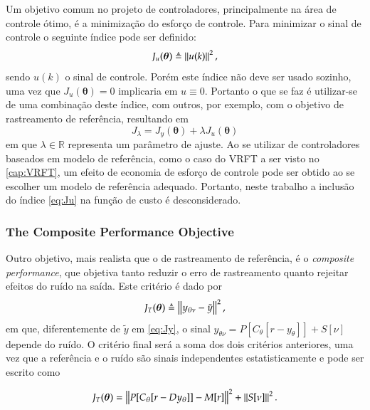 Um objetivo comum no projeto de controladores, principalmente na área de controle ótimo, é a minimização do esforço de controle. Para minimizar o sinal de controle o seguinte índice pode ser definido:
\begin{equation}
   J_u(\bm{\theta}) \triangleq \left\lVert u(k) \right\rVert^{2},
   \label{eq:Ju}
\end{equation}
sendo $u(k)$ o sinal de controle. Porém este índice não deve ser usado sozinho, uma vez que $J_u(\bm{\theta}) = 0$ implicaria em $u \equiv 0$. Portanto o que se faz é utilizar-se de uma combinação deste índice, com outros, por exemplo, com o objetivo de rastreamento de referência, resultando em 
\begin{equation}
   J_\lambda = J_y(\bm{\theta}) + \lambda J_u(\bm{\theta})
   \label{eq:Jl}
\end{equation}
em que $\lambda \in \mathbb{R}$ representa um parâmetro de ajuste.
Ao se utilizar de controladores baseados em modelo de referência, como o caso do VRFT a ser visto no \ref{cap:VRFT}, um efeito de economia de esforço de controle pode ser obtido ao se escolher um modelo de referência adequado. Portanto, neste trabalho a inclusão do índice \eqref{eq:Ju} na função de custo é desconsiderado.



\subsubsection{The Composite Performance Objective}%
\label{sub:the_composite_performance_objective}

Outro objetivo, mais realista que o de rastreamento de referência, é o \textit{composite performance}, que objetiva tanto reduzir o erro de rastreamento quanto rejeitar efeitos do ruído na saída. Este critério é dado por
\begin{equation}
   J_T(\bm{\theta}) \triangleq \left\lVert y_{\theta\nu} - \tilde{y} \right\rVert^2,
   \label{eq:JT}
\end{equation}
em que, diferentemente de $\tilde{y}$ em \eqref{eq:Jy}, o sinal $y_{\theta\nu}= P[C_\theta[r-y_\theta]] + S[\nu]$ depende do ruído. O critério final será a soma dos dois critérios anteriores, uma vez que a referência e o ruído são sinais independentes estatisticamente e pode ser escrito como

\begin{equation}
   J_T(\bm{\theta}) = \left\lVert P[C_\theta[r-Dy_\theta]] - M[r] \right\rVert^{2} + \left\lVert S[\nu] \right\rVert^2.
   \label{eq:}
\end{equation}






